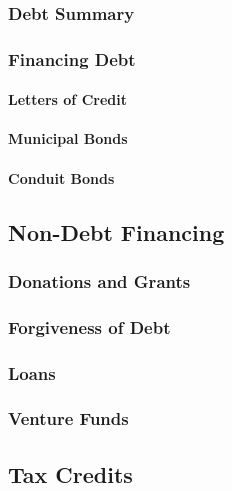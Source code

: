 \subsubsection{Debt Summary}\indent%
\label{sec:debt_summary}

\subsubsection{Financing Debt}\indent%
\label{sec:financing_debt}

\paragraph{Letters of Credit}
\paragraph{Municipal Bonds}
\paragraph{Conduit Bonds}

\subsection{Non-Debt Financing}\indent%
\label{sec:non_debt_financing}

\subsubsection{Donations and Grants}\indent%
\label{sec:donations_grants}

\subsubsection{Forgiveness of Debt}\indent%
\label{sec:forgiveness_debt}

\subsubsection{Loans}\indent%
\label{sec:loans}

\subsubsection{Venture Funds}\indent%
\label{sec:venture_funds}

\subsection{Tax Credits}\indent%
\label{sec:tax-credit}

